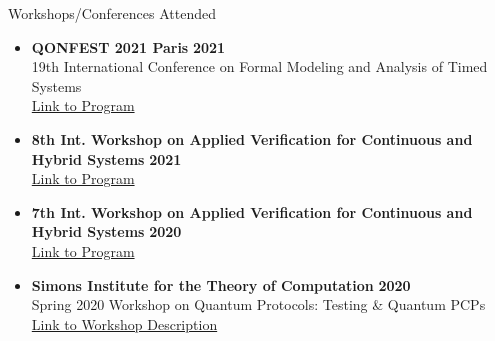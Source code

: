 \documentclass{resume} %
\begin{document}
\begin{rSection}{Workshops/Conferences Attended}
\begin{itemize}[leftmargin=*]
  \item {\bf QONFEST 2021 Paris } \hfill {\bf 2021} \\
  19th International Conference on Formal Modeling and Analysis of Timed Systems \\
  \href{https://qonfest2021.lacl.fr/formats21.php}{Link to Program}

  \item {\bf  8th Int. Workshop on Applied Verification for Continuous and Hybrid Systems} \hfill {\bf 2021} \\
  \href{https://cps-vo.org/group/ARCH/archive}{Link to Program}

  \item {\bf  7th Int. Workshop on Applied Verification for Continuous and Hybrid Systems} \hfill {\bf 2020} \\
  \href{https://cps-vo.org/group/ARCH/archive}{Link to Program}

  \item {\bf Simons Institute for the Theory of Computation} \hfill {\bf 2020} \\
  Spring 2020 Workshop on Quantum Protocols: Testing \& Quantum PCPs \\
  \href{https://simons.berkeley.edu/workshops/quantum-2020-2}{Link to Workshop Description}
\end{itemize}
\end{rSection}
\end{document}

